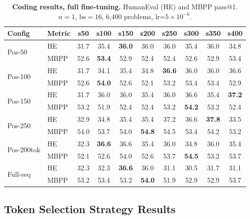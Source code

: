 \documentclass[10pt]{article}
\begin{document}
\begin{table}[!htbp]
\centering
\caption{\textbf{Coding results, full fine-tuning.} HumanEval (HE) and MBPP pass@1. $n{=}1$, $\text{bs}{=}16$, 6,400 problems, lr=$5{\times}10^{-6}$.}
\label{tab:app_coding_fullft}
\footnotesize
\begin{tabular}{llcccccccc}
\toprule
\textbf{Config} & \textbf{Metric} & \textbf{s50} & \textbf{s100} & \textbf{s150} & \textbf{s200} & \textbf{s250} & \textbf{s300} & \textbf{s350} & \textbf{s400} \\
\midrule
\multirow{2}{*}{Pos-50} & HE & 31.7 & 35.4 & \textbf{36.0} & 36.0 & 36.0 & 35.4 & 36.0 & 34.8 \\
 & MBPP & 52.6 & \textbf{53.4} & 52.9 & 52.4 & 52.4 & 52.6 & 52.9 & 53.4 \\
\midrule
\multirow{2}{*}{Pos-100} & HE & 31.7 & 34.1 & 35.4 & 34.8 & \textbf{36.6} & 36.0 & 36.0 & 36.6 \\
 & MBPP & 52.6 & \textbf{54.0} & 52.6 & 52.1 & 53.2 & 53.4 & 53.4 & 52.9 \\
\midrule
\multirow{2}{*}{Pos-150} & HE & 31.7 & 36.0 & 36.0 & 35.4 & 36.0 & 36.6 & 35.4 & \textbf{37.2} \\
 & MBPP & 53.2 & 51.9 & 52.4 & 52.4 & 53.2 & \textbf{54.2} & 53.2 & 52.4 \\
\midrule
\multirow{2}{*}{Pos-250} & HE & 32.9 & 34.8 & 35.4 & 35.4 & 37.2 & 36.6 & \textbf{37.8} & 33.5 \\
 & MBPP & 54.0 & 53.7 & 54.0 & \textbf{54.8} & 54.5 & 53.4 & 54.2 & 53.2 \\
\midrule
\multirow{2}{*}{Pos-200tok} & HE & 32.3 & \textbf{36.6} & 36.6 & 35.4 & 36.0 & 34.8 & 36.0 & 35.4 \\
 & MBPP & 52.1 & 52.6 & 54.0 & 52.6 & 53.7 & \textbf{54.5} & 53.2 & 53.7 \\
\midrule
\multirow{2}{*}{Full-seq} & HE & 32.3 & 32.3 & \textbf{36.6} & 36.0 & 31.1 & 30.5 & 31.7 & 31.1 \\
 & MBPP & 53.2 & 53.4 & 53.2 & \textbf{54.0} & 51.9 & 52.9 & 52.9 & 53.7 \\
\bottomrule
\end{tabular}
\end{table}


\subsection{Token Selection Strategy Results}
\label{app:token_selection}
\end{document}
